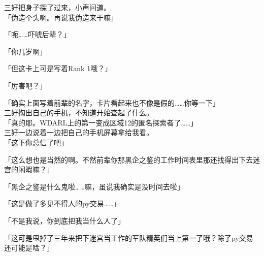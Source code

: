 三好把身子探了过来，小声问道。\\

「伪造个头啊。再说我伪造来干嘛」

「呃……吓唬后辈？」

「你几岁啊」

「但这卡上可是写着Rank 1哦？」

「厉害吧？」

「确实上面写着前辈的名字，卡片看起来也不像是假的……你等一下」\\

三好掏出自己的手机，不知道开始查起了什么。\\

「真的耶。WDARL上的第一变成区域12的匿名探索者了……」\\

三好一边说着一边把自己的手机屏幕拿给我看。\\

「这下你总信了吧」

「这么想也是当然的啊。不然前辈你那黑企之鉴的工作时间表里那还找得出下去迷宫的闲暇嘛？」

「黑企之鉴是什么鬼啦……嘛，虽说我确实是没时间去啦」

「这是做了多见不得人的py交易……」

「不是我说，你到底把我当什么人了」

「这可是甩掉了三年来把下迷宫当工作的军队精英们当上第一了哦？除了py交易还可能是啥？」

